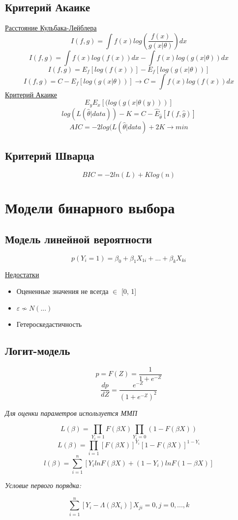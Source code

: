 \documentclass[a4paper, 12pt]{article}
\begin{document}
\subsection{Критерий Акаике}

\underline{Расстояние Кульбака-Лейблера}
\[I(f, g) = \int f(x)log\left(\frac{f(x)}{g(x|\theta)}\right) dx\]
\[I(f, g) = \int f(x)log(f(x))dx - \int f(x)log(g(x|\theta))dx\]
\[I(f, g) = E_{f}[log(f(x))] - E_{f}[log(g(x|\theta))]\]
\[I(f, g) = C - E_{f}[log(g(x|\theta))] \rightarrow C = \int f(x)log(f(x))dx\]
\underline{Критерий Акаике}
\[E_{y}E_{x}[(log(g(x|\theta(y)))]\]
\[log(L(\hat{\theta}|data)) - K = C - \hat{E}_{\hat{\theta}}[I(f, \hat{g})]\]
\[AIC = -2log(L(\hat{\theta}|data) + 2K \rightarrow min\]

\subsection{Критерий Шварца}
\[BIC = -2ln(L) + Klog(n)\]

\section{Модели бинарного выбора}

\subsection{Модель линейной вероятности}

\[p(Y_{i} = 1) = \beta_{0} + \beta_{1}X_{1i} + ... + \beta_{k}X_{ki}\]

\underline{Недостатки}
\begin{itemize}
    \item Оцененные значения не всегда $\in$ [0, 1]
    \item $\varepsilon \nsim N(...)$
    \item Гетероскедастичность
\end{itemize}

\subsection{Логит-модель}

\[p = F(Z) = \frac{1}{1 + e^{-Z}}\]
\[\frac{dp}{dZ} = \frac{e^{-Z}}{(1 + e^{-Z})^{2}}\]
\begin{center}
    \textit{Для оценки параметров используется ММП}
\end{center}
\[L(\beta) = \prod_{Y_{i} = 1}F(\beta X) \prod_{Y_{i}  = 0}(1 - F(\beta X))\]
\[L(\beta) = \prod_{i = 1}[F(\beta X)]^{Y_{i}}[1 - F(\beta X)]^{1 - Y_{i}}\]
\[l(\beta) = \sum_{i = 1}^{n} [Y_{i}lnF(\beta X) + (1 - Y_{i})lnF(1 - \beta X)]\]
\begin{center}
    \textit{Условие первого порядка:}
\end{center}
\[\sum_{i = 1}^{n}[Y_{i} - \Lambda(\beta X_{i})]X_{ji} = 0, j = 0, ..., k\]
\end{document}
